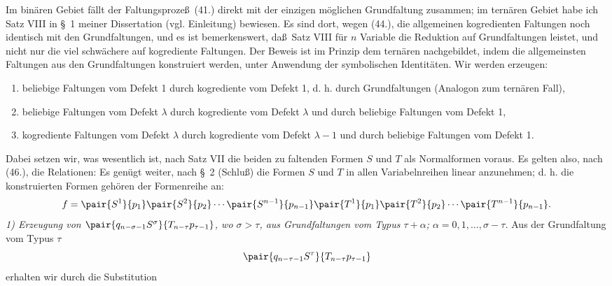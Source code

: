 Im bin\"aren Gebiet f\"allt der Faltungsproze\ss\ (41.) direkt mit der einzigen m\"oglichen Grundfaltung zusammen; im tern\"aren Gebiet habe ich Satz VIII in \S\ 1 meiner Dissertation (vgl. Einleitung) bewiesen. Es sind dort, wegen (44.), die allgemeinen kogredienten Faltungen noch identisch mit den Grundfaltungen, und es ist bemerkenswert, da\ss\ Satz VIII f\"ur $n$ Variable die Reduktion auf Grundfaltungen leistet, und nicht nur die viel schw\"achere auf kogrediente Faltungen. Der Beweis ist im Prinzip dem tern\"aren nachgebildet, indem die allgemeinsten Faltungen aus den Grundfaltungen konstruiert werden, unter Anwendung der symbolischen Identit\"aten. Wir werden erzeugen:
\begin{enumerate}
\renewcommand{\labelenumi}{\arabic{enumi})}
\item beliebige Faltungen vom Defekt 1 durch kogrediente vom Defekt 1, d. h. durch Grundfaltungen (Analogon zum tern\"aren Fall),
\item beliebige Faltungen vom Defekt $\lambda$ durch kogrediente vom Defekt $\lambda$ und durch beliebige Faltungen vom Defekt 1,
\item kogrediente Faltungen vom Defekt $\lambda$ durch kogrediente vom Defekt $\lambda-1$ und durch beliebige Faltungen vom Defekt 1.
\end{enumerate}
Dabei setzen wir, was wesentlich ist, nach Satz VII die beiden zu faltenden Formen $S$ und $T$ als Normalformen voraus. Es gelten also, nach (46.), die Relationen:
Es gen\"ugt weiter, nach \S\ 2 (Schlu\ss) die Formen $S$ und $T$ in allen Variabelnreihen linear anzunehmen; d. h. die konstruierten Formen geh\"oren der Formenreihe an:
\[
 f=\pair{S^1}{p_1}\pair{S^2}{p_2}\cdots\pair{S^{n-1}}{p_{n-1}}
   \pair{T^1}{p_1}\pair{T^2}{p_2}\cdots\pair{T^{n-1}}{p_{n-1}}.
\]
\emph{1) Erzeugung von $\pair{q_{n-\sigma-1}S^\sigma}{T_{n-\tau}p_{\tau-1}}$, wo $\sigma>\tau$, aus Grundfaltungen vom Typus $\tau+\alpha$; $\alpha=0,1,\ldots,\sigma-\tau$.} Aus der Grundfaltung vom Typus $\tau$
\[
 \pair{q_{n-\tau-1}S^\tau}{T_{n-\tau}p_{\tau-1}}
\]
erhalten wir durch die Substitution
